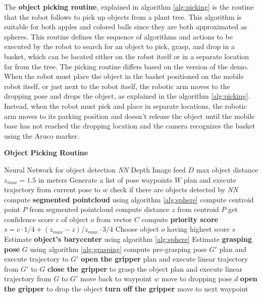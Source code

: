 The \textbf{object picking routine}, explained in algorithm \ref{alg:picking} is the routine that the robot follows
to pick up objects from a plant tree. This algorithm is suitable for both apples and colored balls since they are
both approximated as spheres. This routine defines the sequence of algorithms and actions to be executed by the robot
to search for an object to pick, grasp, and drop in a basket, which can be located either on the robot itself
or in a separate location far from the tree.
The picking routine differs based on the version of the demo. When the robot must place the object
in the basket positioned on the mobile robot itself, or just next to the robot itself, the robotic arm moves to
the dropping pose and drops the object, as explained in the algorithm \ref{alg:picking}. Instead, when the robot
must pick and place in separate locations, the robotic arm moves to its parking position and doesn't release the object
until the mobile base has not reached the dropping location and the camera recognizes the basket using the Aruco marker.

\begin{algorithm}[H]
    \caption{\textbf{Object Picking Routine}}
    \label{alg:picking}
    \begin{algorithmic}[1]
        \Require Neural Network for object detection \textit{NN}
        \Require Depth Image feed $D$
        \State max object distance $z_{max} = 1.5$ in meters
        \State Generate a list of pose waypoints $W$
            \State plan and execute trajectory from current pose to $w$
            \State check if there are objects detected by \textit{NN}
                \State compute \textbf{segmented pointcloud} using algorithm \ref{alg:sphere}
                \State compute centroid point $P$ from segmented pointcloud
                \State compute distance $z$ from centroid $P$
                \State get confidence score $c$ of object $o$ from vector $C$
                \State compute \textbf{priority score} $s = c \cdot 1/4 + (z_{max} - z)/z_{max} \cdot 3/4$
            \EndFor
            \State Choose object $o$ having highest score $s$
        \EndFor
        \State Estimate \textbf{object's barycenter} using algorithm \ref{alg:sphere}
        \State Estimate \textbf{grasping pose} $G$ using algorithm \ref{alg:grasping}
            \State compute pre-grasping pose $G'$
            \State plan and execute trajectory to $G'$
            \State \textbf{open the gripper}
            \State plan and execute linear trajectory from $G'$ to $G$
            \State \textbf{close the gripper} to grasp the object
            \State plan and execute linear trajectory from $G$ to $G'$
            \State move back to waypoint $w$
            \State move to dropping pose $d$
            \State \textbf{open the gripper} to drop the object
            \State \textbf{turn off the gripper}
        \Else
            \State move to next waypoint
        \EndIf
    \end{algorithmic}
\end{algorithm}

